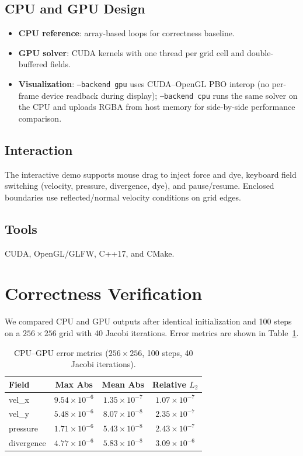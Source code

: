 \documentclass[10pt,a4paper]{article}
\begin{document}
\subsection{CPU and GPU Design}
\begin{itemize}
    \item \textbf{CPU reference}: array-based loops for correctness baseline.
    \item \textbf{GPU solver}: CUDA kernels with one thread per grid cell and double-buffered fields.
    \item \textbf{Visualization}: \texttt{--backend gpu} uses CUDA--OpenGL PBO interop (no per-frame device readback during display); \texttt{--backend cpu} runs the same solver on the CPU and uploads RGBA from host memory for side-by-side performance comparison.
\end{itemize}

\subsection{Interaction}
The interactive demo supports mouse drag to inject force and dye, keyboard field switching (velocity, pressure, divergence, dye), and pause/resume. Enclosed boundaries use reflected/normal velocity conditions on grid edges.

\subsection{Tools}
CUDA, OpenGL/GLFW, C++17, and CMake.

\section{Correctness Verification}
We compared CPU and GPU outputs after identical initialization and 100 steps on a $256 \times 256$ grid with 40 Jacobi iterations. Error metrics are shown in Table~\ref{tab:correctness}.

\begin{table}[H]
\centering
\caption{CPU--GPU error metrics ($256 \times 256$, 100 steps, 40 Jacobi iterations).}
\label{tab:correctness}
\begin{tabular}{lccc}
\toprule
Field & Max Abs & Mean Abs & Relative $L_2$ \\
\midrule
vel\_x & $9.54 \times 10^{-6}$ & $1.35 \times 10^{-7}$ & $1.07 \times 10^{-7}$ \\
vel\_y & $5.48 \times 10^{-6}$ & $8.07 \times 10^{-8}$ & $2.35 \times 10^{-7}$ \\
pressure & $1.71 \times 10^{-6}$ & $5.43 \times 10^{-8}$ & $2.43 \times 10^{-7}$ \\
divergence & $4.77 \times 10^{-6}$ & $5.83 \times 10^{-8}$ & $3.09 \times 10^{-6}$ \\
\bottomrule
\end{tabular}
\end{table}
\end{document}
